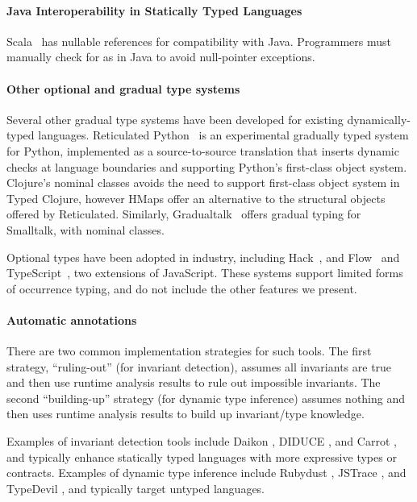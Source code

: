 \documentclass[9pt]{extarticle}
\begin{document}
\paragraph{Java Interoperability in Statically Typed Languages}
Scala~\cite{OCD+} has nullable references for compatibility with Java.
Programmers must manually check for
 as in Java to avoid null-pointer exceptions. 


\paragraph{Other optional and gradual type systems}
Several other gradual type
systems have been developed for existing
dynamically-typed languages.  Reticulated Python~\cite{Vitousek14} is
an experimental gradually typed system for Python, implemented as a
source-to-source translation that inserts dynamic checks at language
boundaries and supporting Python's first-class object system. 
Clojure's nominal classes avoids the need to support
first-class object system in Typed Clojure, however HMaps offer an alternative to
the structural objects offered by Reticulated. Similarly,
Gradualtalk~\cite{gradualtalk} offers gradual typing for Smalltalk,
with nominal classes.

Optional types
have been  adopted in industry, including Hack~\cite{hack}, and Flow~\cite{flow} and
TypeScript~\cite{typescript}, two extensions of JavaScript. These
systems  support  limited forms of occurrence typing,
and do not include the other features we
present.

\paragraph{Automatic annotations}
There are two common implementation strategies for such tools. The first
strategy, ``ruling-out'' (for invariant detection), assumes all invariants are true 
and then use runtime analysis results to rule out
impossible invariants. The second ``building-up'' strategy (for dynamic type inference)
assumes nothing and then uses runtime analysis results to build up invariant/type knowledge.

Examples of invariant detection tools include Daikon \cite{Ernst06thedaikon},
DIDUCE \cite{hangal2002tracking}, and Carrot \cite{pytlik2003automated}, and
typically enhance statically typed languages with more expressive types or contracts.
Examples of dynamic type inference include Rubydust \cite{An10dynamicinference},
JSTrace \cite{saftoiu2010jstrace}, and TypeDevil \cite{pradel2015typedevil},
and typically target untyped languages.
\end{document}
